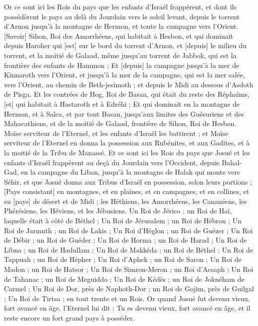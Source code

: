 \begin{multicols}{2}
\VerseOne{}Or ce sont ici les Rois du pays que les enfants d'Israël frappèrent, et dont ils possédèrent le pays au delà du Jourdain vers le soleil levant, depuis le torrent d'Arnon jusqu'à la montagne de Hermon, et toute la campagne vers l'Orient.
[Savoir] Sihon, Roi des Amorrhéens, qui habitait à Hesbon, et qui dominait depuis Haroher qui [est] sur le bord du torrent d'Arnon, et [depuis] le milieu du torrent, et la moitié de Galaad, même jusqu'au torrent de Jabbok, qui est la frontière des enfants de Hammon ;
Et [depuis] la campagne jusqu'à la mer de Kinnaroth vers l'Orient, et jusqu'à la mer de la campagne, qui est la mer salée, vers l'Orient, au chemin de Beth-jesimoth ; et depuis le Midi au dessous d'Asdoth de Pisga.
Et les contrées de Hog, Roi de Basan, qui était du reste des Réphaïms, [et] qui habitait à Hastaroth et à Edréhi ;
Et qui dominait en la montagne de Hermon, et à Salca, et par tout Basan, jusqu'aux limites des Guésuriens et des Mahacathiens, et de la moitié de Galaad, frontière de Sihon, Roi de Hesbon.
Moïse serviteur de l'Eternel, et les enfants d'Israël les battirent ; et Moïse serviteur de l'Eternel en donna la possession aux Rubénites, et aux Gadites, et à la moitié de la Tribu de Manassé.
Et ce sont ici les Rois du pays que Josué et les enfants d'Israël frappèrent au deçà du Jourdain vers l'Occident, depuis Bahal-Gad, en la campagne du Liban, jusqu'à la montagne de Halak qui monte vers Séhir, et que Josué donna aux Tribus d'Israël en possession, selon leurs portions ;
[Pays consistant] en montagnes, et en plaines, et en campagnes, et en collines, et en [pays] de désert et de Midi ; les Héthiens, les Amorrhéens, les Cananéens, les Phérésiens, les Héviens, et les Jébusiens.
Un Roi de Jérico ; un Roi de Haï, laquelle était à côté de Béthel ;
Un Roi de Jérusalem ; un Roi de Hébron ;
Un Roi de Jarmuth ; un Roi de Lakis ;
Un Roi d'Héglon ; un Roi de Guézer ;
Un Roi de Débir ; un Roi de Guéder ;
Un Roi de Horma ; un Roi de Harad ;
Un Roi de Libna ; un Roi de Hadullam ;
Un Roi de Makkéda ; un Roi de Béthel ;
Un Roi de Tappuah ; un Roi de Hépher ;
Un Roi d'Aphek ; un Roi de Saron ;
Un Roi de Madon ; un Roi de Hatsor ;
Un Roi de Simron-Meron ; un Roi d'Acsaph ;
Un Roi de Tahanac ; un Roi de Meguiddo ;
Un Roi de Kédès ; un Roi de Joknéham de Carmel ;
Un Roi de Dor, près de Naphoth-Dor ; un Roi de Gojim, près de Guilgal ;
Un Roi de Tirtsa ; en tout trente et un Rois.
\VerseOne{}Or quand Josué fut devenu vieux, fort avancé en âge, l'Eternel lui dit : Tu es devenu vieux, fort avancé en âge, et il reste encore un fort grand pays à posséder.

\end{multicols}

